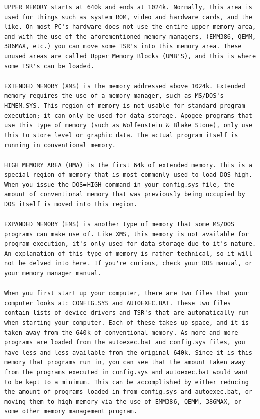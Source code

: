 \documentclass[book.tex]{subfiles}
\begin{document}
\begin{lstlisting}[breaklines=true,breakindent=0em]
UPPER MEMORY starts at 640k and ends at 1024k. Normally, this area is used for things such as system ROM, video and hardware cards, and the like. On most PC's hardware does not use the entire upper memory area, and with the use of the aforementioned memory managers, (EMM386, QEMM, 386MAX, etc.) you can move some TSR's into this memory area. These unused areas are called Upper Memory Blocks (UMB'S), and this is where some TSR's can be loaded.

EXTENDED MEMORY (XMS) is the memory addressed above 1024k. Extended memory requires the use of a memory manager, such as MS/DOS's HIMEM.SYS. This region of memory is not usable for standard program execution; it can only be used for data storage. Apogee programs that use this type of memory (such as Wolfenstein & Blake Stone), only use this to store level or graphic data. The actual program itself is running in conventional memory.

HIGH MEMORY AREA (HMA) is the first 64k of extended memory. This is a special region of memory that is most commonly used to load DOS high. When you issue the DOS=HIGH command in your config.sys file, the amount of conventional memory that was previously being occupied by DOS itself is moved into this region.

EXPANDED MEMORY (EMS) is another type of memory that some MS/DOS programs can make use of. Like XMS, this memory is not available for program execution, it's only used for data storage due to it's nature. An explanation of this type of memory is rather technical, so it will not be delved into here. If you're curious, check your DOS manual, or your memory manager manual.

When you first start up your computer, there are two files that your computer looks at: CONFIG.SYS and AUTOEXEC.BAT. These two files contain lists of device drivers and TSR's that are automatically run when starting your computer. Each of these takes up space, and it is taken away from the 640k of conventional memory. As more and more programs are loaded from the autoexec.bat and config.sys files, you have less and less available from the original 640k. Since it is this memory that programs run in, you can see that the amount taken away from the programs executed in config.sys and autoexec.bat would want to be kept to a minimum. This can be accomplished by either reducing the amount of programs loaded in from config.sys and autoexec.bat, or moving them to high memory via the use of EMM386, QEMM, 386MAX, or some other memory management program.
   \end{lstlisting}

 
\end{document}
